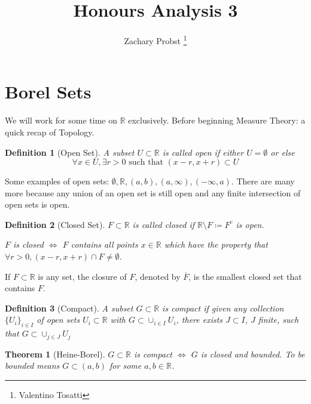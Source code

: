 \documentclass[11pt]{article}
\title{Honours Analysis 3}
\author{Zachary Probst \thanks{Valentino Tosatti}}
\newtheorem{theorem}{Theorem}[section]
\newtheorem{definition}{Definition}[section]
\begin{document}
    \maketitle


    \section{Borel Sets}\label{sec:borel-sets}

    We will work for some time on $\mathbb{R}$ exclusively.
    Before beginning Measure Theory: a quick recap of Topology.

    \begin{definition}[Open Set]
        A subset $U \subset \mathbb{R}$ is called \emph{open} if either $U = \emptyset$ or else
        \[
            \forall x \in U, \exists r > 0 \text{ such that } (x-r,x+r) \subset U
        \]
    \end{definition}

    Some examples of open sets: $\emptyset, \mathbb{R}, (a,b), (a,\infty), (-\infty, a)$.
    There are many more because any union of an open set is still open and any finite intersection of open sets is open.

    \begin{definition}[Closed Set]
        $F \subset \mathbb{R}$ is called \emph{closed} if $\mathbb{R} \setminus F \coloneqq F^c $ is open.

        $F$ is closed $\iff$ $F$ contains all points $x \in \mathbb{R}$ which have the property that $\forall r > 0, (x-r, x+r) \cap F \neq \emptyset$.
    \end{definition}

    If $F \subset \mathbb{R}$ is any set, the closure of $F$, denoted by $\overline{F}$, is the smallest closed set that contains $F$.

    \begin{definition}[Compact]
        A subset $G \subset \mathbb{R}$ is \emph{compact} if given any collection $\{ U_i \}_{i \in I}$ of open sets $U_i \subset \mathbb{R}$ with $G \subset \cup_{i \in I} U_i$, there exists $J \subset I$, $J$ finite, such that $G \subset \cup_{j \in J} U_j$
    \end{definition}

    \begin{theorem}[Heine-Borel]
        $G \subset \mathbb{R}$ is compact $\iff$ $G$ is closed and bounded.
        To be bounded means $G \subset (a,b)$ for some $a,b \in \mathbb{R}$.
    \end{theorem}
\end{document}
